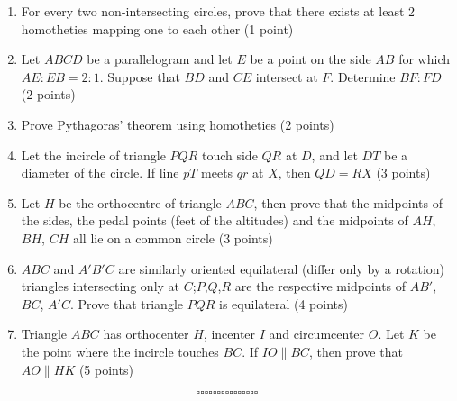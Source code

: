 \documentclass[12pt]{article}
\theoremstyle{definition}
\begin{document}
\begin{enumerate}
    \item For every two non-intersecting circles, prove that there exists at least 2 homotheties mapping one to each other (1 point)\\

    \item Let $ABCD$ be a parallelogram and let $E$ be a point on the side $AB$ for which $AE:EB= 2 : 1$. Suppose that $BD$ and $CE$ intersect at $F$. Determine $BF:FD$ (2 points)\\

    \item Prove Pythagoras' theorem using homotheties (2 points)\\
    
    \item Let the incircle of triangle $PQR$ touch side $QR$ at $D$, and let $DT$ be a diameter of the circle. If line $pT$ meets $qr$ at $X$, then $QD = RX$ (3 points)\\
    
    \item Let $H$ be the orthocentre of triangle $ABC$, then prove that the midpoints of the sides, the pedal points (feet of the altitudes) and the midpoints of $AH$, $BH$, $CH$ all lie on a common circle (3 points)\\
    
    \item $ABC$ and $A'B'C$ are similarly oriented equilateral (differ only by a rotation) triangles intersecting only at $C$;$P$,$Q$,$R$ are the respective midpoints of $AB'$, $BC$, $A'C$. Prove that triangle $PQR$ is equilateral (4 points)\\
    
    \item Triangle $ABC$ has orthocenter $H$, incenter $I$ and circumcenter $O$. Let $K$ be the point where the incircle touches $BC$. If $IO\parallel BC$, then prove that $AO\parallel HK$ (5 points)\\

\end{enumerate}
$$\square \square \square \square \square \square \square \square \square \square \square \square \square \square \square $$
\end{document}
